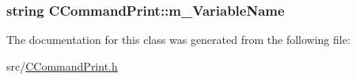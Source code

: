 \subsubsection[{\texorpdfstring{m\+\_\+\+Variable\+Name}{m_VariableName}}]{\setlength{\rightskip}{0pt plus 5cm}string C\+Command\+Print\+::m\+\_\+\+Variable\+Name\hspace{0.3cm}{\ttfamily [private]}}\hypertarget{classCCommandPrint_a423ba460b4328ceea9ff994b4934b474}{}\label{classCCommandPrint_a423ba460b4328ceea9ff994b4934b474}


The documentation for this class was generated from the following file\+:\begin{DoxyCompactItemize}
\item 
src/\hyperlink{CCommandPrint_8h}{C\+Command\+Print.\+h}\end{DoxyCompactItemize}
